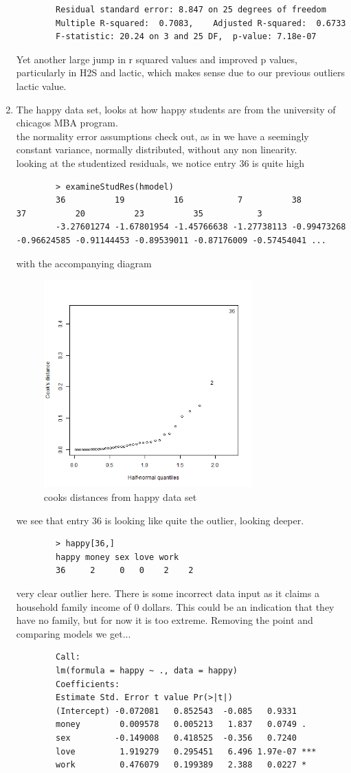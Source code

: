 \documentclass[11pt]{article}
\begin{document}
\begin{enumerate}
\begin{verbatim}
	 	Residual standard error: 8.847 on 25 degrees of freedom
	 	Multiple R-squared:  0.7083,	Adjusted R-squared:  0.6733 
	 	F-statistic: 20.24 on 3 and 25 DF,  p-value: 7.18e-07
	 \end{verbatim}
	 Yet another large jump in r squared values and improved p values, particularly in H2S and lactic, which makes sense due to our previous outliers lactic value.
	 \item
	 The happy data set, looks at how happy students are from the university of chicagos MBA program.
	 \\
	 the normality error assumptions check out, as in we have a seemingly constant variance, normally distributed, without any non linearity.
	 \\
	 looking at the studentized residuals, we notice entry 36 is quite high
	 \begin{verbatim}
	 	> examineStudRes(hmodel)
	 	36          19          16           7          38          37          20          23          35           3 
	 	-3.27601274 -1.67801954 -1.45766638 -1.27738113 -0.99473268 -0.96624585 -0.91144453 -0.89539011 -0.87176009 -0.57454041 ...
	 \end{verbatim}
	 with the accompanying diagram
	 \begin{figure}[H]
	 	\centering
	 	\includegraphics[width=8cm,height=8cm]{happyCD.png}
	 	\caption[happyCD]{cooks distances from happy data set}
	 	\label{CD check on happy data set}
	 \end{figure}
	 we see that entry 36 is looking like quite the outlier, looking deeper.
	 \begin{verbatim}
	 	> happy[36,]
	 	happy money sex love work
	 	36     2     0   0    2    2
	 \end{verbatim}
	 very clear outlier here. There is some incorrect data input as it claims a household family income of 0 dollars. This could be an indication that they have no family, but for now it is too extreme. Removing the point and comparing models we get...
	 \begin{verbatim}
	 	Call:
	 	lm(formula = happy ~ ., data = happy)
	 	Coefficients:
	 	Estimate Std. Error t value Pr(>|t|)    
	 	(Intercept) -0.072081   0.852543  -0.085   0.9331    
	 	money        0.009578   0.005213   1.837   0.0749 .  
	 	sex         -0.149008   0.418525  -0.356   0.7240    
	 	love         1.919279   0.295451   6.496 1.97e-07 ***
	 	work         0.476079   0.199389   2.388   0.0227 *  
	 	

\end{verbatim}
\end{enumerate}
\end{document}

